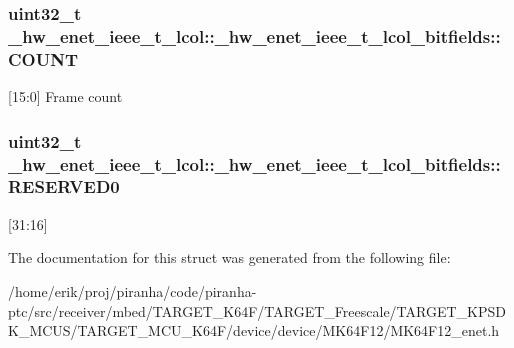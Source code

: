 \subsubsection[{\texorpdfstring{C\+O\+U\+NT}{COUNT}}]{\setlength{\rightskip}{0pt plus 5cm}uint32\+\_\+t \+\_\+hw\+\_\+enet\+\_\+ieee\+\_\+t\+\_\+lcol\+::\+\_\+hw\+\_\+enet\+\_\+ieee\+\_\+t\+\_\+lcol\+\_\+bitfields\+::\+C\+O\+U\+NT}\hypertarget{struct__hw__enet__ieee__t__lcol_1_1__hw__enet__ieee__t__lcol__bitfields_ac36b1e266c17715ddba8a6846dc4bed1}{}\label{struct__hw__enet__ieee__t__lcol_1_1__hw__enet__ieee__t__lcol__bitfields_ac36b1e266c17715ddba8a6846dc4bed1}
\mbox{[}15\+:0\mbox{]} Frame count 
\subsubsection[{\texorpdfstring{R\+E\+S\+E\+R\+V\+E\+D0}{RESERVED0}}]{\setlength{\rightskip}{0pt plus 5cm}uint32\+\_\+t \+\_\+hw\+\_\+enet\+\_\+ieee\+\_\+t\+\_\+lcol\+::\+\_\+hw\+\_\+enet\+\_\+ieee\+\_\+t\+\_\+lcol\+\_\+bitfields\+::\+R\+E\+S\+E\+R\+V\+E\+D0}\hypertarget{struct__hw__enet__ieee__t__lcol_1_1__hw__enet__ieee__t__lcol__bitfields_a41528206b55dcbfabf1009ecdb2f1380}{}\label{struct__hw__enet__ieee__t__lcol_1_1__hw__enet__ieee__t__lcol__bitfields_a41528206b55dcbfabf1009ecdb2f1380}
\mbox{[}31\+:16\mbox{]} 

The documentation for this struct was generated from the following file\+:\begin{DoxyCompactItemize}
\item 
/home/erik/proj/piranha/code/piranha-\/ptc/src/receiver/mbed/\+T\+A\+R\+G\+E\+T\+\_\+\+K64\+F/\+T\+A\+R\+G\+E\+T\+\_\+\+Freescale/\+T\+A\+R\+G\+E\+T\+\_\+\+K\+P\+S\+D\+K\+\_\+\+M\+C\+U\+S/\+T\+A\+R\+G\+E\+T\+\_\+\+M\+C\+U\+\_\+\+K64\+F/device/device/\+M\+K64\+F12/M\+K64\+F12\+\_\+enet.\+h\end{DoxyCompactItemize}
